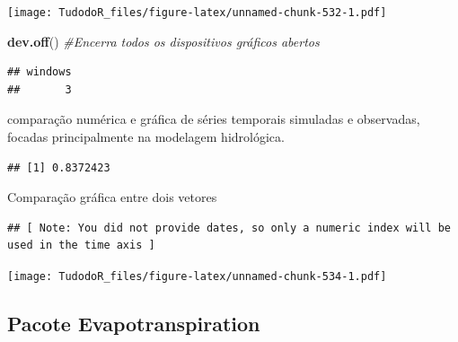 \documentclass[
]{book}
\newenvironment{Shaded}{\begin{snugshade}}{\end{snugshade}}
\newcommand{\CommentTok}[1]{\textcolor[rgb]{0.56,0.35,0.01}{\textit{#1}}}
\newcommand{\DataTypeTok}[1]{\textcolor[rgb]{0.13,0.29,0.53}{#1}}
\newcommand{\KeywordTok}[1]{\textcolor[rgb]{0.13,0.29,0.53}{\textbf{#1}}}
\newcommand{\NormalTok}[1]{#1}
\newcommand{\OperatorTok}[1]{\textcolor[rgb]{0.81,0.36,0.00}{\textbf{#1}}}
\begin{document}
\texttt{[image: TudodoR\_files/figure-latex/unnamed-chunk-532-1.pdf]}

\begin{Shaded}
\begin{Highlighting}[]
\KeywordTok{dev.off}\NormalTok{() }\CommentTok{#Encerra todos os dispositivos gráficos abertos}
\end{Highlighting}
\end{Shaded}

\begin{verbatim}
## windows 
##       3
\end{verbatim}

comparação numérica e gráfica de séries temporais simuladas e observadas, focadas principalmente na modelagem hidrológica.

\begin{Shaded}
\end{Shaded}

\begin{verbatim}
## [1] 0.8372423
\end{verbatim}

Comparação gráfica entre dois vetores

\begin{Shaded}
\end{Shaded}

\begin{verbatim}
## [ Note: You did not provide dates, so only a numeric index will be used in the time axis ]
\end{verbatim}

\texttt{[image: TudodoR\_files/figure-latex/unnamed-chunk-534-1.pdf]}

\hypertarget{pacote-evapotranspiration}{%
\subsection{Pacote Evapotranspiration}\label{pacote-evapotranspiration}}
\end{document}
